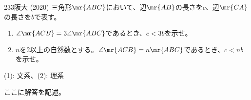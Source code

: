 \begin{prob}{233}{}{阪大 (2020)}
 三角形$\mr{ABC}$において、辺$\mr{AB}$の長さを$c$、辺$\mr{CA}$の長さを$b$で表す。
 \begin{enumerate}
  \item $\angle\mr{ACB}=3\angle\mr{ABC}$であるとき、$c<3b$を示せ。
  \item $n$を2以上の自然数とする。$\angle\mr{ACB}=n\mr{ABC}$であるとき、$c<nb$を示せ。
 \end{enumerate}
 \begin{flushright}
  {\small (1): 文系、(2): 理系}
 \end{flushright}
\end{prob}
ここに解答を記述。